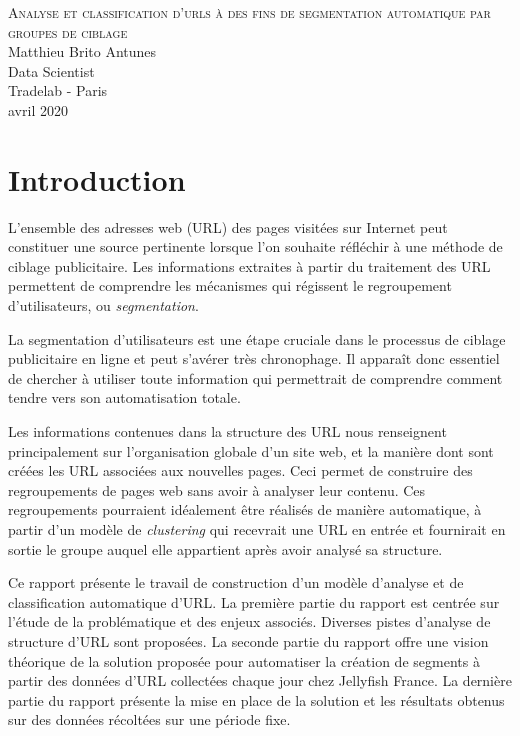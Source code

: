 \documentclass[11pt, a4paper]{article}
\begin{document}
	
\begin{titlepage}
\centering
\LARGE{\textsc{Analyse et classification d'urls à des fins de segmentation automatique par groupes de ciblage}}\\
\vfill
\large Matthieu Brito Antunes\\
\large Data Scientist\\
\large Tradelab - Paris\\
\large avril 2020\\
\end{titlepage}

\newpage
\tableofcontents
\listoftables
\listoffigures
\thispagestyle{empty}

\newpage
{}

\section{Introduction}
\label{sec:intro}

L'ensemble des adresses web (URL) des pages visitées sur Internet peut constituer une source pertinente lorsque l'on souhaite réfléchir à une méthode de ciblage publicitaire. Les informations extraites à partir du traitement des URL permettent de comprendre les mécanismes qui régissent le regroupement d'utilisateurs, ou \textit{segmentation}. 

La segmentation d'utilisateurs est une étape cruciale dans le processus de ciblage publicitaire en ligne et peut s'avérer très chronophage. Il apparaît donc essentiel de chercher à utiliser toute information qui permettrait de comprendre comment tendre vers son automatisation totale.

Les informations contenues dans la structure des URL nous renseignent principalement sur l'organisation globale d'un site web, et la manière dont sont créées les URL associées aux nouvelles pages. Ceci permet de construire des regroupements de pages web sans avoir à analyser leur contenu. Ces regroupements pourraient idéalement être réalisés de manière automatique, à partir d'un modèle de \textit{clustering} qui recevrait une URL en entrée et fournirait en sortie le groupe auquel elle appartient après avoir analysé sa structure.

Ce rapport présente le travail de construction d'un modèle d'analyse et de classification automatique d'URL. La première partie du rapport est centrée sur l'étude de la problématique et des enjeux associés. Diverses pistes d'analyse de structure d'URL sont proposées. La seconde partie du rapport offre une vision théorique de la solution proposée pour automatiser la création de segments à partir des données d'URL collectées chaque jour chez Jellyfish France. La dernière partie du rapport présente la mise en place de la solution et les résultats obtenus sur des données récoltées sur une période fixe.
\end{document}
